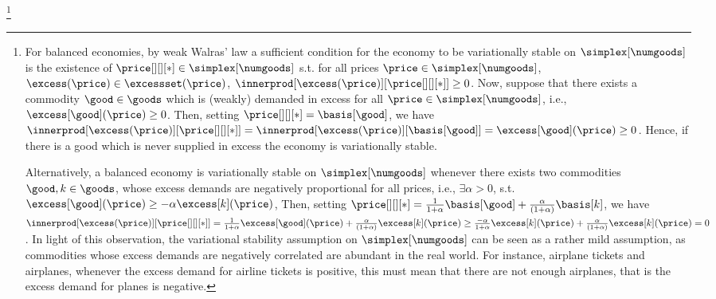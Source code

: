 \footnote{For balanced economies, by weak Walras' law a sufficient condition for the economy to be variationally stable on $\simplex[\numgoods]$ is the existence of $\price[][][*] \in \simplex[\numgoods]$ s.t. for all prices $\price \in \simplex[\numgoods]$, $\excess(\price) \in \excessset(\price)$, $
        \innerprod[{ \excess(\price)}][{\price[][][*]}] \geq 0$.
Now, suppose that there exists a commodity $\good \in \goods$ which is (weakly) demanded in excess for all $\price \in \simplex[\numgoods]$, i.e., $\excess[\good](\price) \geq 0$. Then, setting $\price[][][*] = \basis[\good]$, we have $\innerprod[{ \excess(\price)}][{\price[][][*]}] = \innerprod[{ \excess(\price)}][{\basis[\good]}] = \excess[\good](\price) \geq 0$. Hence, if there is a good which is never supplied in excess the economy is variationally stable.

Alternatively, a balanced economy is variationally stable on $\simplex[\numgoods]$ whenever there exists two commodities $\good, k \in \goods$, whose excess demands are negatively proportional for all prices, i.e., $\exists \alpha > 0$, s.t. $\excess[\good](\price) \geq -\alpha \excess[k](\price)$, Then, setting $\price[][][*] = \frac{1}{1 + \alpha}\basis[\good] + \frac{\alpha}{(1+\alpha)} \basis[k]$, we have $\innerprod[{ \excess(\price)}][{\price[][][*]}] = \frac{1}{1 + \alpha}\excess[\good](\price)  + \frac{\alpha}{(1+\alpha)} \excess[k](\price) \geq \frac{-\alpha}{1 + \alpha}\excess[k](\price)  + \frac{\alpha}{(1+\alpha)} \excess[k](\price) = 0$. In light of this observation, the variational stability assumption on $\simplex[\numgoods]$ can be seen as a rather mild assumption, as commodities whose excess demands are negatively correlated are abundant in the real world. For instance,   airplane tickets and airplanes, whenever the excess demand for airline tickets is positive, this must mean that there are not enough airplanes, that is the excess demand for planes is negative.}
\fi 

